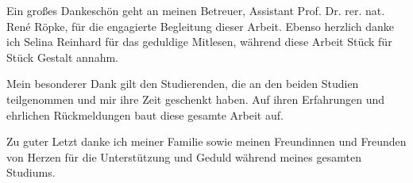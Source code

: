 Ein großes Dankeschön geht an meinen Betreuer, Assistant Prof. Dr. rer. nat. René Röpke, für die engagierte Begleitung dieser Arbeit. Ebenso herzlich danke ich Selina Reinhard für das geduldige Mitlesen, während diese Arbeit Stück für Stück Gestalt annahm.

Mein besonderer Dank gilt den Studierenden, die an den beiden Studien teilgenommen und mir ihre Zeit geschenkt haben. Auf ihren Erfahrungen und ehrlichen Rückmeldungen baut diese gesamte Arbeit auf.

Zu guter Letzt danke ich meiner Familie sowie meinen Freundinnen und Freunden von Herzen für die Unterstützung und Geduld während meines gesamten Studiums.